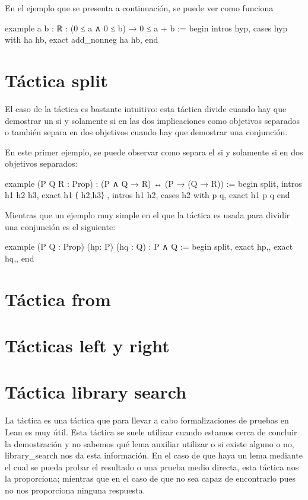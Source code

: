 En el ejemplo que se presenta a continuación, se puede ver como funciona

\begin{leancode}
example {a b : ℝ} : (0 ≤ a ∧ 0 ≤ b) → 0 ≤ a + b :=
begin
  intros hyp,
  cases hyp with ha hb,
  exact add_nonneg ha hb,
end
\end{leancode}


\section{Táctica split}
El caso de la táctica  es bastante intuitivo: esta táctica
divide cuando hay que demostrar un si y solamente si en las dos implicaciones
como objetivos separados o también separa en dos objetivos cuando hay que
demostrar una conjunción.

En este primer ejemplo, se puede observar como separa el si y solamente si en
dos objetivos separados:

\begin{leancode}
example (P Q R : Prop) : (P ∧ Q → R) ↔ (P → (Q → R)) :=
begin
  split, 
  {intros h1 h2 h3,
  exact h1 ⟨ h2,h3⟩ },
  {intros h1 h2,
  cases h2 with p q,
  exact h1 p q}
end
\end{leancode}

Mientras que un ejemplo muy simple en el que la táctica 
es usada para dividir una conjunción es el siguiente:
\begin{leancode}
example (P Q : Prop) (hp: P) (hq : Q) : P ∧ Q :=
begin
  split, 
  {exact hp,},
  {exact hq,},
end
\end{leancode}

\section{Táctica from}

\section{Tácticas left y right}

\section{Táctica library search}
La táctica  es una táctica que para
llevar a cabo formalizaciones de pruebas en Lean es muy útil. Esta táctica se
suele utilizar cuando estamos cerca de concluir la demostración y no sabemos
qué lema auxiliar utilizar o si existe alguno o no, 
{library\_search} nos da esta información. En el caso de que haya un lema
mediante el cual se pueda probar el resultado o una prueba medio directa, esta
táctica nos la proporciona; mientras que en el caso de que no sea capaz de
encontrarlo pues no nos proporciona ninguna respuesta.

